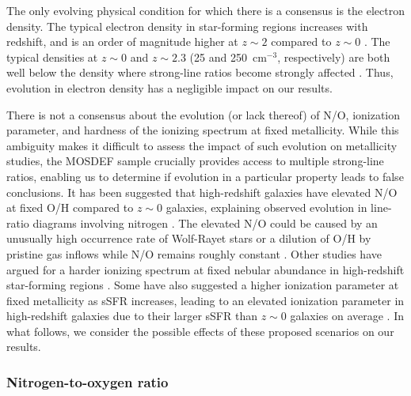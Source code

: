 \documentclass[iop,twocolappendix]{emulateapj}
\begin{document}
The only evolving physical condition for which there is a consensus is the electron density.
  The typical electron density in star-forming regions increases with redshift,
 and is an order of magnitude higher at $z\sim2$ compared to $z\sim0$ \citep[e.g.,][]{ste14,san16a,kas17}.
  The typical densities at $z\sim0$ and $z\sim2.3$ (25 and 250~cm$^{-3}$, respectively) are both well
 below the density where strong-line ratios become strongly affected \citep[$\sim$1000~cm$^{-3}$;][]{ste14}.
  Thus, evolution in electron density has a negligible impact on our results.

There is not a consensus about the evolution (or lack thereof) of N/O, ionization parameter, and
 hardness of the ionizing spectrum at fixed metallicity.  While this ambiguity makes it difficult to assess
 the impact of such evolution on metallicity studies, the MOSDEF sample crucially provides access to
 multiple strong-line ratios, enabling us to determine if evolution in a particular property leads
 to false conclusions.  It has been suggested that high-redshift galaxies have elevated N/O at fixed
 O/H compared to $z\sim0$ galaxies, explaining observed evolution in line-ratio diagrams involving nitrogen
 \citep{mas14,ste14,sha15,san16a}.  The elevated N/O could be caused by an unusually high occurrence rate
 of Wolf-Rayet stars \citep{mas14} or a dilution of O/H by pristine gas inflows while N/O remains roughly
 constant \citep{kop05,amo10,san16a}.
  Other studies have argued for a harder ionizing spectrum at fixed nebular abundance in high-redshift
 star-forming regions \citep{ste16,str17}.
  Some have also suggested a higher ionization parameter at fixed metallicity as sSFR increases,
 leading to an elevated ionization parameter in high-redshift galaxies due to their larger sSFR
 than $z\sim0$ galaxies on average \citep{kew13,kew13t,kew15,kew16,kas17}.
  In what follows, we consider the possible effects of these proposed scenarios on our results.

\subsubsection{Nitrogen-to-oxygen ratio}
\end{document}
